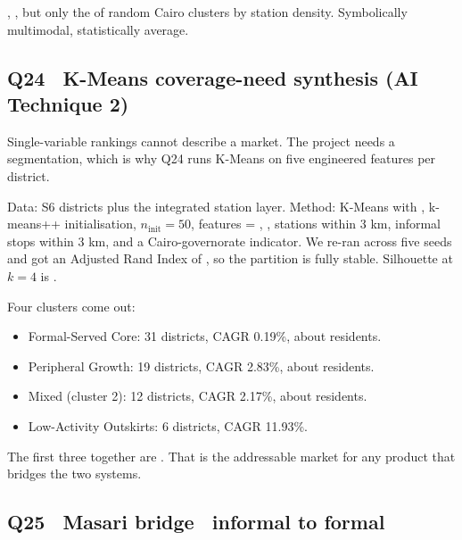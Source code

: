 
, , but only the  of random Cairo clusters
by station density. Symbolically multimodal, statistically average.

\subsection{Q24 \textbullet\ K-Means coverage-need synthesis (AI Technique 2)}

Single-variable rankings cannot describe a market. The project needs
a segmentation, which is why Q24 runs K-Means on five engineered
features per district.

Data: S6 districts plus the integrated station layer. Method: K-Means
with , k-means++ initialisation, $n_{\text{init}}=50$,
features = , , stations within 3 km,
informal stops within 3 km, and a Cairo-governorate indicator. We
re-ran across five seeds and got an Adjusted Rand Index of
, so the partition is fully stable. Silhouette at $k=4$ is
.


Four clusters come out:

\begin{itemize}
 \item Formal-Served Core: 31 districts, CAGR 0.19\%, about
  residents.
 \item Peripheral Growth: 19 districts, CAGR 2.83\%, about
  residents.
 \item Mixed (cluster 2): 12 districts, CAGR 2.17\%, about
  residents.
 \item Low-Activity Outskirts: 6 districts, CAGR 11.93\%.
\end{itemize}

The first three together are . That is the addressable market for any product that
bridges the two systems.

\subsection{Q25 \textbullet\ Masari bridge \textbullet\ informal to formal}

